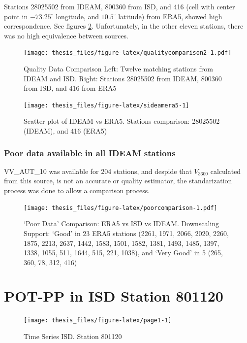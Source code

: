 \documentclass[12pt,oneside]{reedthesis}
\begin{document}
Stations 28025502 from IDEAM, 800360 from ISD, and 416 (cell with center point in \(-73.25^\circ\) longitude, and \(10.5^\circ\) latitude) from ERA5, showed high correspondence. See figures \ref{fig:sideamera5}. Unfortunately, in the other eleven stations, there was no high equivalence between sources.
\begin{figure}
\centering
\texttt{[image: thesis\_files/figure-latex/qualitycomparison2-1.pdf]}
\caption{\label{fig:qualitycomparison2}Quality Data Comparison
Left: Twelve matching stations
from IDEAM and ISD. Right: Stations 28025502 from IDEAM, 800360 from ISD, and 416 from ERA5}
\end{figure}
\begin{figure}

{\centering \texttt{[image: thesis\_files/figure-latex/sideamera5-1]} 

}

\caption{Scatter plot of IDEAM vs ERA5. Stations comparison: 28025502 (IDEAM), and 416 (ERA5)}\label{fig:sideamera5}
\end{figure}
\hypertarget{poor-data-available-in-all-ideam-stations}{%
\subsubsection{Poor data available in all IDEAM stations}\label{poor-data-available-in-all-ideam-stations}}

VV\_AUT\_10 was available for 204 stations, and despide that \(V_{3600}\) calculated from this source, is not an accurate or quality estimator, the standarization process was done to allow a comparison process.
\begin{figure}
\centering
\texttt{[image: thesis\_files/figure-latex/poorcomparison-1.pdf]}
\caption{\label{fig:poorcomparison}`Poor Data' Comparison: ERA5 vs ISD vs IDEAM. Downscaling Support: `Good' in 23 ERA5 stations (2261, 1971, 2066, 2020, 2260, 1875, 2213, 2637, 1442, 1583, 1501, 1582, 1381, 1493, 1485, 1397, 1338, 1055, 511, 1644, 515, 221, 1038), and `Very Good' in 5 (265, 360, 78, 312, 416)}
\end{figure}
\hypertarget{pot-pp-in-isd-station-801120}{%
\section{POT-PP in ISD Station 801120}\label{pot-pp-in-isd-station-801120}}

\footnotesize
\begin{figure}

{\centering \texttt{[image: thesis\_files/figure-latex/page1-1]} 

}

\caption{Time Series ISD. Station 801120}\label{fig:page1}
\end{figure}
\normalsize
\end{document}
